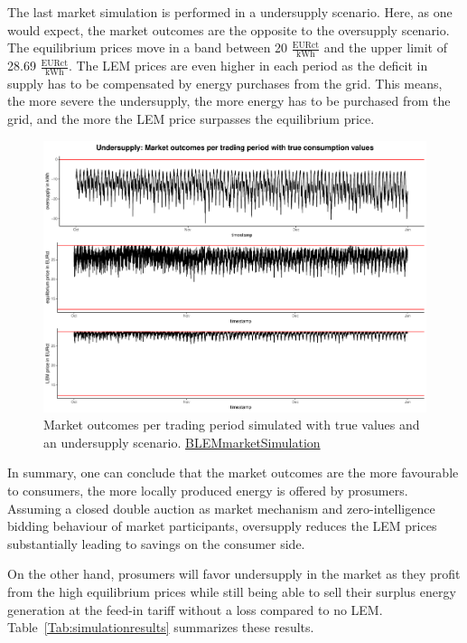 The last market simulation is performed in a undersupply scenario. Here, as one would expect, the market outcomes are the opposite to the oversupply scenario. The equilibrium prices move in a band between 20 $\frac{\text{EURct}}{\text{kWh}}$ and the upper limit of 28.69 $\frac{\text{EURct}}{\text{kWh}}$. The LEM prices are even higher in each period as the deficit in supply has to be compensated by energy purchases from the grid. This means, the more severe the undersupply, the more energy has to be purchased from the grid, and the more the LEM price surpasses the equilibrium price.
%
\begin{figure}[htbp]
    \centering
    \includegraphics[width=\textwidth]{thesis/graphs/marketsimulation/marketoutcome_true_undersupply.pdf}
    \caption[Market outcomes simulated with undersupply and true values]{Market outcomes per trading period simulated with true values and an undersupply scenario. \quantnet\href{https://github.com/QuantLet/BLEM/tree/master/BLEMmarketSimulation}{BLEMmarketSimulation}}
    \label{Fig:marketoutcomes_true_under}
\end{figure}
%

In summary, one can conclude that the market outcomes are the more favourable to consumers, the more locally produced energy is offered by prosumers. Assuming a closed double auction as market mechanism and zero-intelligence bidding behaviour of market participants, oversupply reduces the LEM prices substantially leading to savings on the consumer side.

\noindent On the other hand, prosumers will favor undersupply in the market as they profit from the high equilibrium prices while still being able to sell their surplus energy generation at the feed-in tariff without a loss compared to no LEM. Table~\ref{Tab:simulationresults} summarizes these results.


